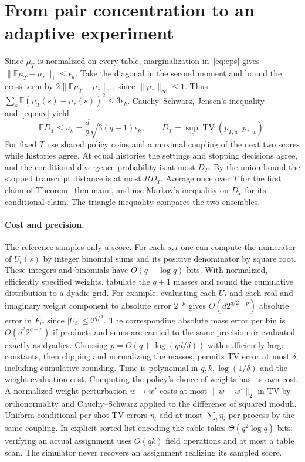 \documentclass[11pt]{article}
\newcommand{\E}{\mathbb E}
\newcommand{\TV}{\operatorname{TV}}
\begin{document}
\section{From pair concentration to an adaptive experiment}
Since $\mu_T$ is normalized on every table, marginalization in~\eqref{eq:eps} gives $\|\E\mu_T-\mu_*\|_1\le\epsilon_k$. Take the diagonal in the second moment and bound the cross term by $2\|\E\mu_T-\mu_*\|_1$, since $\|\mu_*\|_\infty\le1$. Thus $\sum_s\E(\mu_T(s)-\mu_*(s))^2\le3\epsilon_k$. Cauchy--Schwarz, Jensen's inequality and~\eqref{eq:env} yield
\begin{equation}\label{eq:uk}
 \E D_T\le u_k=\frac d2\sqrt{3(q+1)\epsilon_k},\qquad
 D_T=\sup_w\TV(p_{T,w},p_{*,w}).
\end{equation}
For fixed $T$ use shared policy coins and a maximal coupling of the next two scores while histories agree. At equal histories the settings and stopping decisions agree, and the conditional divergence probability is at most $D_T$. By the union bound the stopped transcript distance is at most $R D_T$. Average once over $T$ for the first claim of Theorem~\ref{thm:main}, and use Markov's inequality on $D_T$ for its conditional claim. The triangle inequality compares the two ensembles.

\paragraph{Cost and precision.}
The reference samples only a score. For each $s,t$ one can compute the numerator of $U_t(s)$ by integer binomial sums and its positive denominator by square root. These integers and binomials have $O(q+\log q)$ bits. With normalized, efficiently specified weights, tabulate the $q+1$ masses and round the cumulative distribution to a dyadic grid. For example, evaluating each $U_t$ and each real and imaginary weight component to absolute error $2^{-p}$ gives $O(d2^{q/2-p})$ absolute error in $F_w$ since $|U_t|\le2^{q/2}$. The corresponding absolute mass error per bin is $O(d^2 2^{q-p})$ if products and sums are carried to the same precision or evaluated exactly as dyadics. Choosing $p=O(q+\log(qd/\delta))$ with sufficiently large constants, then clipping and normalizing the masses, permits TV error at most $\delta$, including cumulative rounding. Time is polynomial in $q,k,\log(1/\delta)$ and the weight evaluation cost. Computing the policy's choice of weights has its own cost. A normalized weight perturbation $w\to w'$ costs at most $\|w-w'\|_2$ in TV by orthonormality and Cauchy--Schwarz applied to the difference of squared moduli. Uniform conditional per-shot TV errors $\eta_i$ add at most $\sum_i\eta_i$ per process by the same coupling. In explicit sorted-list encoding the table takes $\Theta(q^2\log q)$ bits; verifying an actual assignment uses $O(qk)$ field operations and at most a table scan. The simulator never recovers an assignment realizing its sampled score.
\end{document}
